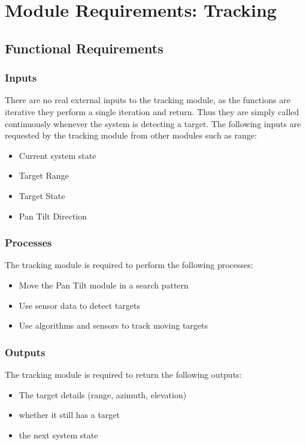 \documentclass[]{report}
\begin{document}
\section{Module Requirements: Tracking}
\subsection{Functional Requirements}
\subsubsection{Inputs}
There are no real external inputs to the tracking module, as the functions are iterative they perform a single iteration and return. Thus they are simply called continuously whenever the system is detecting a target. The following inputs are requested by the tracking module from other modules such as range:
\begin{itemize}
	\item Current system state
	\item Target Range
	\item Target State
	\item Pan Tilt Direction
\end{itemize}

\subsubsection{Processes}
The tracking module is required to perform the following processes:
\begin{itemize}
	\item Move the Pan Tilt module in a search pattern
	\item Use sensor data to detect targets
	\item Use algorithms and sensors to track moving targets
\end{itemize}

\subsubsection{Outputs}
The tracking module is required to return the following outputs:
\begin{itemize}
	\item The target details (range, azimuth, elevation)
	\item whether it still has a target
	\item the next system state
\end{itemize}
\end{document}
